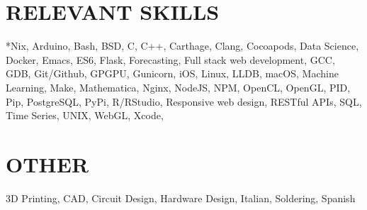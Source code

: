 \documentclass[margin]{res}
\begin{document}
\begin{resume}
\section{RELEVANT SKILLS}
*Nix, Arduino, Bash, BSD, C, C++, Carthage, Clang, Cocoapods, Data Science, Docker, Emacs,
ES6, Flask, Forecasting,
Full stack web development, GCC, GDB, Git/Github, GPGPU, Gunicorn, iOS, Linux, LLDB,
macOS, Machine
Learning, Make, Mathematica, Nginx, NodeJS, NPM, OpenCL, OpenGL, PID, Pip, PostgreSQL,
PyPi, R/RStudio, Responsive web design, RESTful APIs, SQL, Time Series, UNIX, WebGL, Xcode,

  \section{OTHER}
  3D Printing, CAD, Circuit Design,
  Hardware Design, Italian, Soldering, Spanish
 
\end{resume}
\end{document}
